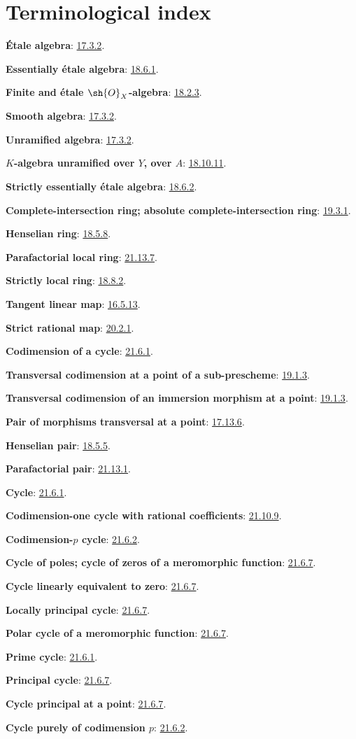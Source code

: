 \clearpage
{}
{}
\section*{Terminological index}

\begingroup
\small
\setlength{\parindent}{0pt}
\setlength{\parskip}{2pt}
\newcommand{\EGAIVterm}[2]{\textbf{#1}: #2.\par}
\newcommand{\EGAIVidxref}[1]{\hyperref[IV.#1]{#1}}

\EGAIVterm{\'Etale algebra}{\EGAIVidxref{17.3.2}}
\EGAIVterm{Essentially \'etale algebra}{\EGAIVidxref{18.6.1}}
\EGAIVterm{Finite and \'etale $\sh{O}_X$-algebra}{\EGAIVidxref{18.2.3}}
\EGAIVterm{Smooth algebra}{\EGAIVidxref{17.3.2}}
\EGAIVterm{Unramified algebra}{\EGAIVidxref{17.3.2}}
\EGAIVterm{$K$-algebra unramified over $Y$, over $A$}{\EGAIVidxref{18.10.11}}
\EGAIVterm{Strictly essentially \'etale algebra}{\EGAIVidxref{18.6.2}}
\EGAIVterm{Complete-intersection ring; absolute complete-intersection ring}{\EGAIVidxref{19.3.1}}
\EGAIVterm{Henselian ring}{\EGAIVidxref{18.5.8}}
\EGAIVterm{Parafactorial local ring}{\EGAIVidxref{21.13.7}}
\EGAIVterm{Strictly local ring}{\EGAIVidxref{18.8.2}}
\EGAIVterm{Tangent linear map}{\EGAIVidxref{16.5.13}}
\EGAIVterm{Strict rational map}{\EGAIVidxref{20.2.1}}
\EGAIVterm{Codimension of a cycle}{\EGAIVidxref{21.6.1}}
\EGAIVterm{Transversal codimension at a point of a sub-prescheme}{\EGAIVidxref{19.1.3}}
\EGAIVterm{Transversal codimension of an immersion morphism at a point}{\EGAIVidxref{19.1.3}}
\EGAIVterm{Pair of morphisms transversal at a point}{\EGAIVidxref{17.13.6}}
\EGAIVterm{Henselian pair}{\EGAIVidxref{18.5.5}}
\EGAIVterm{Parafactorial pair}{\EGAIVidxref{21.13.1}}
\EGAIVterm{Cycle}{\EGAIVidxref{21.6.1}}
\EGAIVterm{Codimension-one cycle with rational coefficients}{\EGAIVidxref{21.10.9}}
\EGAIVterm{Codimension-$p$ cycle}{\EGAIVidxref{21.6.2}}
\EGAIVterm{Cycle of poles; cycle of zeros of a meromorphic function}{\EGAIVidxref{21.6.7}}
\EGAIVterm{Cycle linearly equivalent to zero}{\EGAIVidxref{21.6.7}}
\EGAIVterm{Locally principal cycle}{\EGAIVidxref{21.6.7}}
\EGAIVterm{Polar cycle of a meromorphic function}{\EGAIVidxref{21.6.7}}
\EGAIVterm{Prime cycle}{\EGAIVidxref{21.6.1}}
\EGAIVterm{Principal cycle}{\EGAIVidxref{21.6.7}}
\EGAIVterm{Cycle principal at a point}{\EGAIVidxref{21.6.7}}
\EGAIVterm{Cycle purely of codimension $p$}{\EGAIVidxref{21.6.2}}
